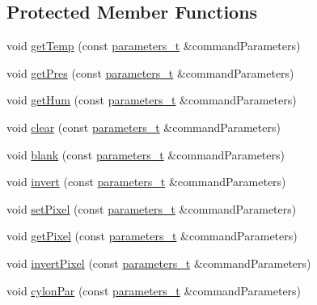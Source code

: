 \subsection*{Protected Member Functions}
\begin{DoxyCompactItemize}
\item 
void \hyperlink{class_m_q_t_tsense_h_a_t_a39ff54904e181f55b4242c800e60a95f}{get\+Temp} (const \hyperlink{_heater_m_q_t_t_8h_ad3b3bd6544a775cf1e31cd71610c5765}{parameters\+\_\+t} \&command\+Parameters)
\item 
void \hyperlink{class_m_q_t_tsense_h_a_t_a30a58adadcb37aeccd992ca9458e17e1}{get\+Pres} (const \hyperlink{_heater_m_q_t_t_8h_ad3b3bd6544a775cf1e31cd71610c5765}{parameters\+\_\+t} \&command\+Parameters)
\item 
void \hyperlink{class_m_q_t_tsense_h_a_t_ad61c2741b9e195b607bb8fe6ac9a3832}{get\+Hum} (const \hyperlink{_heater_m_q_t_t_8h_ad3b3bd6544a775cf1e31cd71610c5765}{parameters\+\_\+t} \&command\+Parameters)
\item 
void \hyperlink{class_m_q_t_tsense_h_a_t_af05cb64126bd0591d5ca4bac5b48b111}{clear} (const \hyperlink{_heater_m_q_t_t_8h_ad3b3bd6544a775cf1e31cd71610c5765}{parameters\+\_\+t} \&command\+Parameters)
\item 
void \hyperlink{class_m_q_t_tsense_h_a_t_a7736e041ad475ec82756223c90da547e}{blank} (const \hyperlink{_heater_m_q_t_t_8h_ad3b3bd6544a775cf1e31cd71610c5765}{parameters\+\_\+t} \&command\+Parameters)
\item 
void \hyperlink{class_m_q_t_tsense_h_a_t_aac0a786db57adb1f70f4932bc3800cff}{invert} (const \hyperlink{_heater_m_q_t_t_8h_ad3b3bd6544a775cf1e31cd71610c5765}{parameters\+\_\+t} \&command\+Parameters)
\item 
void \hyperlink{class_m_q_t_tsense_h_a_t_a2c2134187487882f89a850b6a7f010ec}{set\+Pixel} (const \hyperlink{_heater_m_q_t_t_8h_ad3b3bd6544a775cf1e31cd71610c5765}{parameters\+\_\+t} \&command\+Parameters)
\item 
void \hyperlink{class_m_q_t_tsense_h_a_t_aac431239ec91b0c7647fc90f2780d5e3}{get\+Pixel} (const \hyperlink{_heater_m_q_t_t_8h_ad3b3bd6544a775cf1e31cd71610c5765}{parameters\+\_\+t} \&command\+Parameters)
\item 
void \hyperlink{class_m_q_t_tsense_h_a_t_ae5172290839c6af0821f41bae9cf30c7}{invert\+Pixel} (const \hyperlink{_heater_m_q_t_t_8h_ad3b3bd6544a775cf1e31cd71610c5765}{parameters\+\_\+t} \&command\+Parameters)
\item 
void \hyperlink{class_m_q_t_tsense_h_a_t_a0c2faf77463954149558afc54f965f65}{cylon\+Par} (const \hyperlink{_heater_m_q_t_t_8h_ad3b3bd6544a775cf1e31cd71610c5765}{parameters\+\_\+t} \&command\+Parameters)

\end{DoxyCompactItemize}
